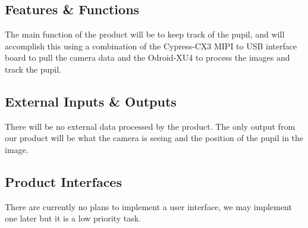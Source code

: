
\subsection{Features \& Functions}
The main function of the product will be to keep track of the pupil, and will accomplish this using a combination of the Cypress-CX3 MIPI to USB interface board to pull the camera data and the Odroid-XU4 to process the images and track the pupil.


\subsection{External Inputs \& Outputs}
There will be no external data processed by the product.
The only output from our product will be what the camera is seeing and the position of the pupil in the image.

\subsection{Product Interfaces}
There are currently no plans to implement a user interface, we may implement one later but it is a low priority task.
